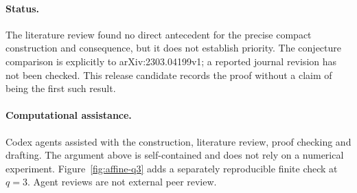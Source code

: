 \documentclass[11pt]{article}
\begin{document}
\paragraph{Status.}
The literature review found no direct antecedent for the precise compact
construction and consequence, but it does not establish priority. The
conjecture comparison is explicitly to arXiv:2303.04199v1; a reported journal
revision has not been checked. This release candidate records the proof without
a claim of being the first such result.

\paragraph{Computational assistance.}
Codex agents assisted with the construction, literature review, proof checking
and drafting. The argument above is self-contained and does not rely on a
numerical experiment. Figure~\ref{fig:affine-q3} adds a separately
reproducible finite check at $q=3$. Agent reviews are not external peer review.
\end{document}
